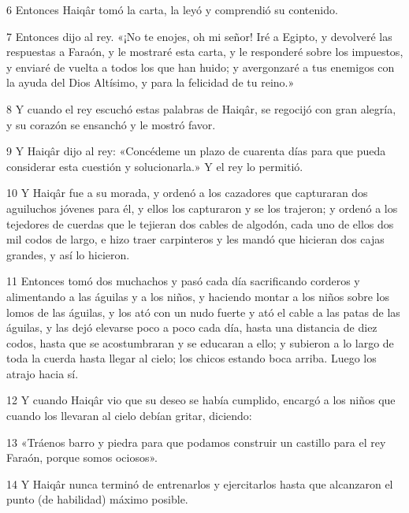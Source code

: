 \par 6 Entonces Haiqâr tomó la carta, la leyó y comprendió su contenido.

\par 7 Entonces dijo al rey. «¡No te enojes, oh mi señor! Iré a Egipto, y devolveré las respuestas a Faraón, y le mostraré esta carta, y le responderé sobre los impuestos, y enviaré de vuelta a todos los que han huido; y avergonzaré a tus enemigos con la ayuda del Dios Altísimo, y para la felicidad de tu reino.»

\par 8 Y cuando el rey escuchó estas palabras de Haiqâr, se regocijó con gran alegría, y su corazón se ensanchó y le mostró favor.

\par 9 Y Haiqâr dijo al rey: «Concédeme un plazo de cuarenta días para que pueda considerar esta cuestión y solucionarla.» Y el rey lo permitió.

\par 10 Y Haiqâr fue a su morada, y ordenó a los cazadores que capturaran dos aguiluchos jóvenes para él, y ellos los capturaron y se los trajeron; y ordenó a los tejedores de cuerdas que le tejieran dos cables de algodón, cada uno de ellos dos mil codos de largo, e hizo traer carpinteros y les mandó que hicieran dos cajas grandes, y así lo hicieron.

\par 11 Entonces tomó dos muchachos y pasó cada día sacrificando corderos y alimentando a las águilas y a los niños, y haciendo montar a los niños sobre los lomos de las águilas, y los ató con un nudo fuerte y ató el cable a las patas de las águilas, y las dejó elevarse poco a poco cada día, hasta una distancia de diez codos, hasta que se acostumbraran y se educaran a ello; y subieron a lo largo de toda la cuerda hasta llegar al cielo; los chicos estando boca arriba. Luego los atrajo hacia sí.

\par 12 Y cuando Haiqâr vio que su deseo se había cumplido, encargó a los niños que cuando los llevaran al cielo debían gritar, diciendo:

\par 13 «Tráenos barro y piedra para que podamos construir un castillo para el rey Faraón, porque somos ociosos».

\par 14 Y Haiqâr nunca terminó de entrenarlos y ejercitarlos hasta que alcanzaron el punto (de habilidad) máximo posible.

